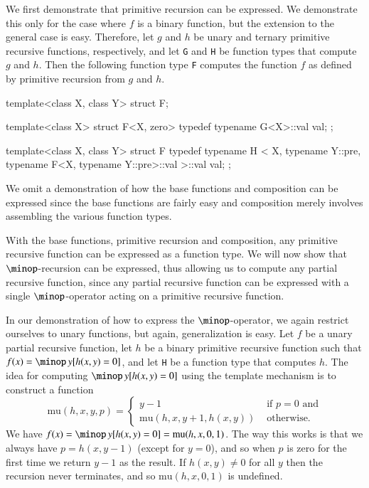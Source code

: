 \documentclass[final]{beatcs}
\newcommand{\cppid}[1]{\texttt{#1}}
\newenvironment{cppsrc}{\begingroup \small \selectfont \verbatim}
{\endverbatim \endgroup}
\begin{document}
We first demonstrate that 
primitive recursion 
can be expressed. We
demonstrate this only for the case 
where 
$f$ is a binary function,
but the
extension to the general case is 
easy. 
Therefore, let 
$g$ and $h$ 
be unary
and ternary primitive recursive functions, respectively, and let \cppid{G} and
\cppid{H} be function types that compute $g$ and $h$. Then the following
function type \cppid{F} computes the function $f$ as defined by primitive
recursion from $g$ and $h$.

\begin{cppsrc}
template<class X, class Y> struct F;

template<class X> struct F<X, zero>
{
	typedef typename G<X>::val val;
};

template<class X, class Y> struct F
{
	typedef typename H
	<
	X, typename Y::pre, typename F<X, typename Y::pre>::val
	>::val val;
};
\end{cppsrc}

We omit a demonstration of how the base functions and 
composition can be expressed since the base functions are fairly easy
and composition merely involves assembling the various function types.

With the base functions, primitive recursion and composition,
any primitive recursive function can be expressed
as a function type.
We will now show that $\minop$-recursion
can be expressed, thus allowing us to compute any partial 
recursive function, since
any partial recursive function can be 
expressed with a single $\minop$-operator acting
on a primitive recursive function.

In our demonstration of how to express the $\minop$-operator, we again 
restrict ourselves to unary functions, but again, generalization is 
easy. Let $f$ be
a unary partial recursive function, let $h$ be a binary primitive recursive
function such that
$f(x) = \minop\, y [h(x,y)=0]$, and
let \cppid{H} be a function type that computes $h$. 
The idea for computing $\minop\, y [h(x,y)=0]$ using the template mechanism is 
to construct a function
\[
\mathrm{mu}(h,x,y,p) = \left\{
\begin{array}{ll}
y-1 & \mbox{ if $p=0$ and} \\
\mathrm{mu}(h,x,y+1,h(x,y)) & \mbox{ otherwise.} 
\end{array} \right.
\]
We have $f(x) = \minop\, y [h(x,y)=0] = \mathrm{mu}(h,x,0,1)$. The way this
works is that we always have $p=h(x,y-1)$ (except for $y=0$), and so when $p$
is zero for the first time we return $y-1$ as the result. If $h(x,y) \neq 0$
for all $y$ then the recursion never terminates, and so $\mathrm{mu}(h,x,0,1)$
is undefined.
\end{document}
